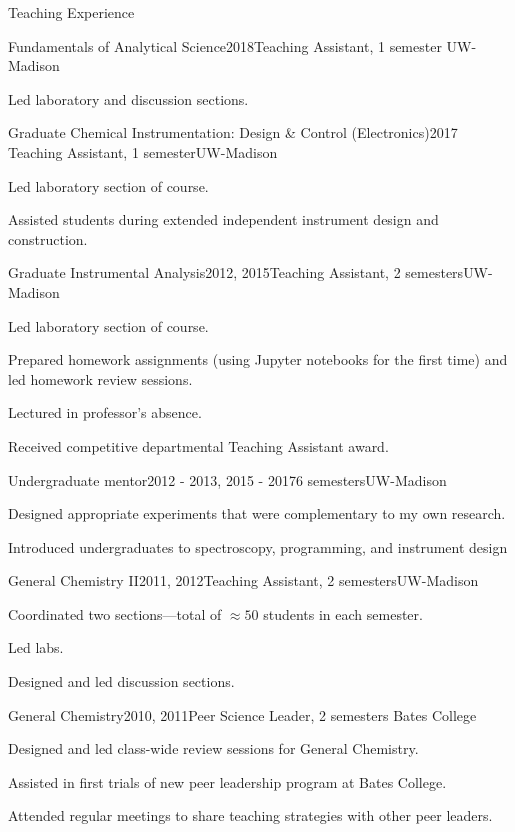 \documentclass{resume}  %
\begin{document}
\clearpage

\begin{rSection}{Teaching Experience}
  \begin{rSubsection}{Fundamentals of Analytical Science}{2018}{Teaching Assistant, 1 semester}
    {UW-Madison}
    \item Led laboratory and discussion sections.
  \end{rSubsection}
  \begin{rSubsection}{Graduate Chemical Instrumentation: Design \& Control (Electronics)}{2017}
    {Teaching Assistant, 1 semester}{UW-Madison}
    \item Led laboratory section of course.
    \item Assisted students during extended independent instrument design and construction.
  \end{rSubsection}
  \begin{rSubsection}{Graduate Instrumental Analysis}{2012, 2015}{Teaching Assistant, 2
      semesters}{UW-Madison}
    \item Led laboratory section of course.
    \item Prepared homework assignments (using Jupyter notebooks for the first time) and led
      homework review sessions.
    \item Lectured in professor's absence.
    \item Received competitive departmental Teaching Assistant award.
  \end{rSubsection}
  \begin{rSubsection}{Undergraduate mentor}{2012 - 2013, 2015 - 2017}{6 semesters}{UW-Madison}
    \item Designed appropriate experiments that were complementary to my own research.
    \item Introduced undergraduates to spectroscopy, programming, and instrument design
  \end{rSubsection}
  \begin{rSubsection}{General Chemistry II}{2011, 2012}{Teaching Assistant, 2
      semesters}{UW-Madison}
    \item Coordinated two sections---total of $\approx50$ students in each semester.
    \item Led labs.
    \item Designed and led discussion sections.
  \end{rSubsection}
  \begin{rSubsection}{General Chemistry}{2010, 2011}{Peer Science Leader, 2 semesters}
    {Bates College}
    \item Designed and led class-wide review sessions for General Chemistry.
    \item Assisted in first trials of new peer leadership program at Bates College.
    \item Attended regular meetings to share teaching strategies with other peer leaders.
  \end{rSubsection}
\end{rSection}
\end{document}
